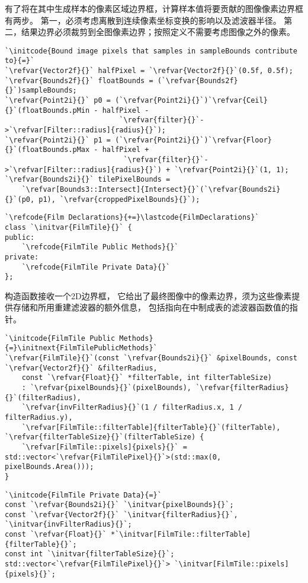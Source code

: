 有了将在其中生成样本的像素区域边界框，计算样本值将要贡献的图像像素边界框有两步。
第一，必须考虑离散到连续像素坐标变换的影响以及滤波器半径。
第二，结果边界必须裁剪到全图像素边界；按照定义不需要考虑图像之外的像素。
\begin{lstlisting}
`\initcode{Bound image pixels that samples in sampleBounds contribute to}{=}`
`\refvar{Vector2f}{}` halfPixel = `\refvar{Vector2f}{}`(0.5f, 0.5f);
`\refvar{Bounds2f}{}` floatBounds = (`\refvar{Bounds2f}{}`)sampleBounds;
`\refvar{Point2i}{}` p0 = (`\refvar{Point2i}{}`)`\refvar{Ceil}{}`(floatBounds.pMin - halfPixel -
                           `\refvar{filter}{}`->`\refvar[Filter::radius]{radius}{}`);
`\refvar{Point2i}{}` p1 = (`\refvar{Point2i}{}`)`\refvar{Floor}{}`(floatBounds.pMax - halfPixel +
                            `\refvar{filter}{}`->`\refvar[Filter::radius]{radius}{}`) + `\refvar{Point2i}{}`(1, 1);
`\refvar{Bounds2i}{}` tilePixelBounds =
    `\refvar[Bounds3::Intersect]{Intersect}{}`(`\refvar{Bounds2i}{}`(p0, p1), `\refvar{croppedPixelBounds}{}`);
\end{lstlisting}
\begin{lstlisting}
`\refcode{Film Declarations}{+=}\lastcode{FilmDeclarations}`
class `\initvar{FilmTile}{}` {
public:
    `\refcode{FilmTile Public Methods}{}`
private:
    `\refcode{FilmTile Private Data}{}`
};
\end{lstlisting}

构造函数接收一个2D边界框，
它给出了最终图像中的像素边界，须为这些像素提供存储和所用重建滤波器的额外信息，
包括指向在{}中制成表的滤波器函数值的指针。
\begin{lstlisting}
`\initcode{FilmTile Public Methods}{=}\initnext{FilmTilePublicMethods}`
`\refvar{FilmTile}{}`(const `\refvar{Bounds2i}{}` &pixelBounds, const `\refvar{Vector2f}{}` &filterRadius,
    const `\refvar{Float}{}` *filterTable, int filterTableSize)
    : `\refvar{pixelBounds}{}`(pixelBounds), `\refvar{filterRadius}{}`(filterRadius),
    `\refvar{invFilterRadius}{}`(1 / filterRadius.x, 1 / filterRadius.y),
    `\refvar[FilmTile::filterTable]{filterTable}{}`(filterTable), `\refvar{filterTableSize}{}`(filterTableSize) {
    `\refvar[FilmTile::pixels]{pixels}{}` = std::vector<`\refvar{FilmTilePixel}{}`>(std::max(0, pixelBounds.Area()));
}
\end{lstlisting}

\begin{lstlisting}
`\initcode{FilmTile Private Data}{=}`
const `\refvar{Bounds2i}{}` `\initvar{pixelBounds}{}`;
const `\refvar{Vector2f}{}` `\initvar{filterRadius}{}`, `\initvar{invFilterRadius}{}`;
const `\refvar{Float}{}` *`\initvar[FilmTile::filterTable]{filterTable}{}`;
const int `\initvar{filterTableSize}{}`;
std::vector<`\refvar{FilmTilePixel}{}`> `\initvar[FilmTile::pixels]{pixels}{}`;
\end{lstlisting}

